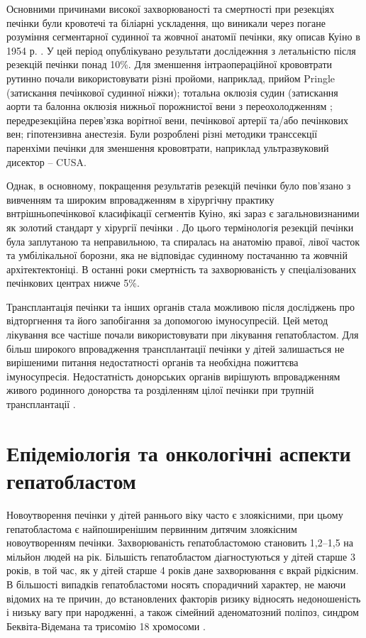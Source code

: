 Основними причинами високої захворюваності та смертності при резекціях печінки були кровотечі та біліарні ускладення, що виникали через погане розуміння сегментарної судинної та жовчної анатомії печінки, яку описав Куіно в 1954 р. \cite{pmid12778356}. У цей період опублікувано результати дослідежння з летальністю після резекцій печінки понад 10\%. Для зменшення інтраопераційної крововтрати рутинно почали використовувати різні пройоми, наприклад, прийом Pringle \cite{pmid15285242} (затискання печінкової судинної ніжки); тотальна оклюзія судин (затискання аорти та балонна оклюзія нижньої порожнистої вени з  переохолодженням \cite{pmid1328586}; передрезекційна перев'язка ворітної вени, печінкової артерії та/або печінкових вен; гіпотензивна анестезія. Були розроблені різні методики транссекції паренхіми печінки для зменшення крововтрати, наприклад ультразвуковий дисектор – CUSA. 

Однак, в основному, покращення результатів резекцій печінки було пов’язано з вивченням та широким впровадженням в хірургічну практику внтрішньопечінкової класифікації сегментів Куіно, які зараз є загальновизнаними як золотий стандарт у хірургії печінки \cite{pmid12778356}. До цього термінологія резекцій печінки була заплутаною та неправильною, та спиралась на анатомію правої, лівої часток та умбілікальної борозни, яка не відповідає судинному постачанню та жовчній архітектектоніці.
В останні роки смертність та захворюваність у спеціалізованих печінкових центрах нижче 5\%. 

Трансплантація печінки та інших органів стала можливою після досліджень про відторгнення та його запобігання за допомогою імуносупресій. Цей метод лікування все частіше почали використовувати при лікування гепатобластом. Для більш широкого впровадження трансплантації печінки у дітей залишається не вирішеними питання недостатності органів та необхідна пожиттєва імуносупресія. Недостатність донорських органів вирішують впровадженням живого родинного донорства та розділенням цілої печінки при трупній трансплантації \cite{pmid14746860}. 

\section{Епідеміологія та онкологічні аспекти гепатобластом}
Новоутворення печінки у дітей раннього віку часто є злоякісними, при цьому гепатобластома є найпоширенішим первинним дитячим злоякісним новоутворенням  печінки. Захворюваність гепатобластомою становить 1,2–1,5 на мільйон людей на рік. Більшість гепатобластом  діагностуються у дітей старше 3 років, в той час, як у дітей старше  4 років дане захворювання є вкрай рідкісним. В більшості випадків гепатобластоми носять спорадичний характер, не маючи відомих на те причин, до встановлених факторів ризику відносять недоношеність і низьку вагу при народженні, а також сімейний аденоматозний поліпоз, синдром Беквіта-Відемана та трисомію 18 хромосоми \cite{pmid15285242}. 

